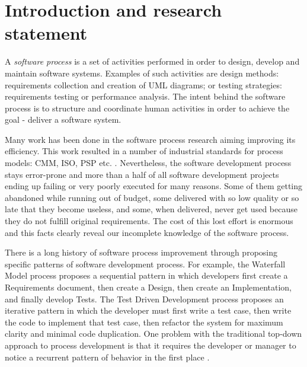 \chapter{Introduction and research statement}
A \textit{software process} is a set of activities performed in order to design, develop and maintain software systems. Examples of such activities are design methods: requirements collection and creation of UML diagrams; or testing strategies: requirements testing or performance analysis. The intent behind the software process is to structure and coordinate human activities in order to achieve the goal - deliver a software system.

Many work has been done in the software process research aiming improving its efficiency. This work resulted in a number of industrial standards for process models: CMM, ISO, PSP etc. \cite{citeulike:5043104}. Nevertheless, the software development process stays error-prone and more than a half of all software development projects ending up failing or very poorly executed for many reasons. Some of them getting abandoned while running out of budget, some delivered with so low quality or so late that they become useless, and some, when delivered, never get used because they do not fulfill original requirements. The cost of this lost effort is enormous and this facts clearly reveal our incomplete knowledge of the software process.

There is a long history of software process improvement through proposing specific patterns of software development process. For example, the Waterfall Model process proposes a sequential pattern in which developers first create a Requirements document, then create a Design, then create an Implementation, and finally develop Tests. The Test Driven Development process proposes an iterative pattern in which the developer must first write a test case, then write the code to implement that test case, then refactor the system for maximum clarity and minimal code duplication. One problem with the traditional top-down approach to process development is that it requires the developer or manager to notice a recurrent pattern of behavior in the first place \cite{citeulike:5043104}. 

